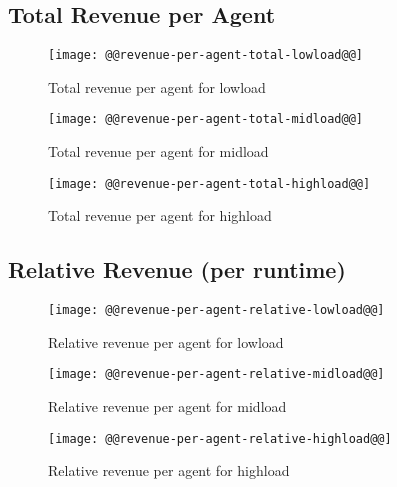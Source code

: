 \documentclass[11pt]{article}
\begin{document}
\newpage
\subsection{Total Revenue per Agent}
\begin{figure}[htbp]
  \begin{center}
    \texttt{[image: @@revenue-per-agent-total-lowload@@]}
    \caption{Total revenue per agent for lowload}
    \label{fig:revenue-per-agent-total-lowload}
  \end{center}
\end{figure}
\begin{figure}[htbp]
  \begin{center}
    \texttt{[image: @@revenue-per-agent-total-midload@@]}
    \caption{Total revenue per agent for midload}
    \label{fig:revenue-per-agent-total-midload}
  \end{center}
\end{figure}
\begin{figure}[htbp]
  \begin{center}
    \texttt{[image: @@revenue-per-agent-total-highload@@]}
    \caption{Total revenue per agent for highload}
    \label{fig:revenue-per-agent-total-highload}
  \end{center}
\end{figure}

\newpage
\subsection{Relative Revenue (per runtime)}
\begin{figure}[htbp]
  \begin{center}
    \texttt{[image: @@revenue-per-agent-relative-lowload@@]}
    \caption{Relative revenue per agent for lowload}
    \label{fig:revenue-per-agent-relative-lowload}
  \end{center}
\end{figure}
\begin{figure}[htbp]
  \begin{center}
    \texttt{[image: @@revenue-per-agent-relative-midload@@]}
    \caption{Relative revenue per agent for midload}
    \label{fig:revenue-per-agent-relative-midload}
  \end{center}
\end{figure}
\begin{figure}[htbp]
  \begin{center}
    \texttt{[image: @@revenue-per-agent-relative-highload@@]}
    \caption{Relative revenue per agent for highload}
    \label{fig:revenue-per-agent-relative-highload}
  \end{center}
\end{figure}
\end{document}
